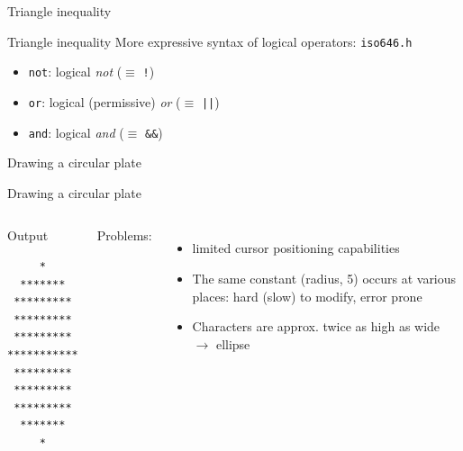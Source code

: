 \documentclass[usenames,dvipsnames,aspectratio=169]{beamer}
\newcommand{\kiemel}[1]{{\color{kiemelesszin}#1}}
\begin{document}
\begin{frame}{Triangle inequality}
  \begin{exampleblock}{}
    \fontsize{8}{9} \selectfont
    \vspace{-.3cm}
    
    \vspace{-.3cm}
  \end{exampleblock}
\end{frame}

\begin{frame}{Triangle inequality}
  More expressive syntax of logical operators: \texttt{\kiemel{iso646.h}}
  \begin{itemize}
    \item \kiemel{\texttt{not}}: logical \emph{not} ($\equiv$ \texttt{!})
    \item \kiemel{\texttt{or}}: logical (permissive) \emph{or} ($\equiv$ \texttt{||})
    \item \kiemel{\texttt{and}}: logical \emph{and} ($\equiv$ \texttt{\&\&})
  \end{itemize}
\end{frame}

\begin{frame}{Drawing a circular plate}
    \begin{exampleblock}{}
    \scriptsize
    
  \end{exampleblock}
\end{frame}

\begin{frame}[fragile]{Drawing a circular plate}
  \begin{columns}[c]
      \scriptsize
      \begin{block}{Output}
        \begin{verbatim}
     *     
  *******  
 ********* 
 ********* 
 ********* 
***********
 ********* 
 ********* 
 ********* 
  *******  
     *
\end{verbatim}
      \end{block}
      Problems:
      \begin{itemize}
        \item limited cursor positioning capabilities
        \item The same constant (radius, 5) occurs at various places: hard (slow) to modify, error prone
        \item Characters are approx. twice as high as wide $\to$ ellipse
      \end{itemize}
  \end{columns}  
\end{frame}
\end{document}
